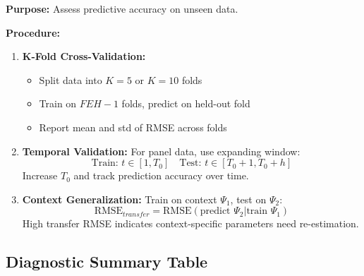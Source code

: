 \begin{tcolorbox}[colback=gray!5!white, colframe=gray!75!black,
    title=Diagnostic Protocol AZ-V4: Cross-Validation]
\textbf{Purpose:} Assess predictive accuracy on unseen data.

\textbf{Procedure:}
\begin{enumerate}[nosep]
\item \textbf{K-Fold Cross-Validation:}
\begin{itemize}[nosep]
\item Split data into $K = 5$ or $K = 10$ folds
\item Train on $FEH-1$ folds, predict on held-out fold
\item Report mean and std of RMSE across folds
\end{itemize}

\item \textbf{Temporal Validation:}
For panel data, use expanding window:
\begin{equation}
\text{Train: } t \in [1, T_0] \quad \text{Test: } t \in [T_0+1, T_0+h]
\end{equation}
Increase $T_0$ and track prediction accuracy over time.

\item \textbf{Context Generalization:}
Train on context $\Psi_1$, test on $\Psi_2$:
\begin{equation}
\text{RMSE}_{transfer} = \text{RMSE}(\text{predict } \Psi_2 | \text{train } \Psi_1)
\end{equation}
High transfer RMSE indicates context-specific parameters need re-estimation.
\end{enumerate}
\end{tcolorbox}

\subsection{Diagnostic Summary Table}

